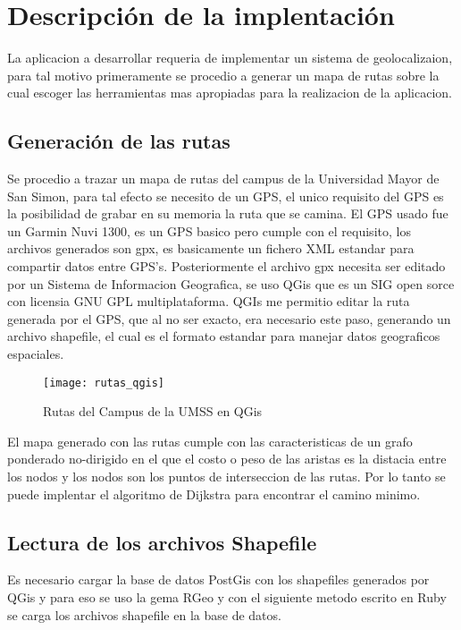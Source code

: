 \chapter{Descripci\'on de la implentaci\'on} %
\label{cha:descripcion_de_la_implentacion}


  
  La aplicacion a desarrollar requeria de implementar un sistema de geolocalizaion, para tal motivo primeramente se procedio a generar un mapa de rutas sobre la cual escoger las herramientas mas apropiadas para la realizacion de la aplicacion.

  \section{Generaci\'on de las rutas} %
  \label{sec:generacion_de_las_rutas}
    Se procedio a trazar un mapa de rutas del campus de la Universidad Mayor de San Simon, para tal efecto se necesito de un GPS, el unico requisito del GPS es la posibilidad de grabar en su memoria la ruta que se camina. El GPS usado fue un Garmin Nuvi 1300, es un GPS basico pero cumple con el requisito, los archivos generados son gpx, es basicamente un fichero XML estandar para compartir datos entre GPS's. 
    Posteriormente 
    el archivo gpx necesita ser editado por un Sistema de Informacion Geografica, se uso QGis que es un SIG open sorce con licensia  GNU GPL multiplataforma. QGIs me permitio editar la ruta generada por el GPS, que al no ser exacto, era necesario este paso, generando un archivo shapefile, el cual es el formato estandar para manejar datos geograficos espaciales.

    \begin{figure}[!ht]
      \begin{center}
        \texttt{[image: rutas\_qgis]}
      \end{center}
      \caption{Rutas del Campus de la UMSS en QGis}
      \label{fig:rutas}
    \end{figure}

    El mapa generado con las rutas cumple con las caracteristicas de un grafo ponderado no-dirigido en el que el costo o peso de las aristas es la distacia entre los nodos y los nodos son los puntos de interseccion de las rutas. Por lo tanto se puede implentar el algoritmo de Dijkstra para encontrar el camino minimo.

  \section{Lectura de los archivos Shapefile} %
  \label{sec:lectura_de_los_archivos_shapefile}
    Es necesario cargar la base de datos PostGis con los shapefiles generados por QGis y para eso se uso la gema RGeo y con el siguiente metodo escrito en Ruby se carga los archivos shapefile en la base de datos.

